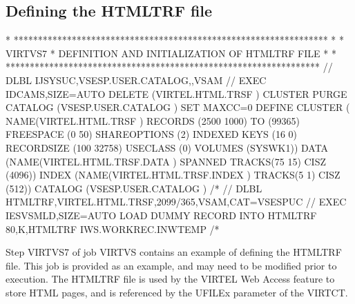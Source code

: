 \documentclass[letterpaper,10pt,english]{sphinxmanual}
\begin{document}
\subsection{Defining the HTMLTRF file}
\label{\detokenize{Installation_Guide:defining-the-htmltrf-file}}
\begin{sphinxVerbatim}[commandchars=\\\{\}]
* *****************************************************************
* * VIRTVS7 * DEFINITION AND INITIALIZATION OF HTMLTRF FILE *
* *****************************************************************
// DLBL IJSYSUC,\PYGZsq{}VSESP.USER.CATALOG\PYGZsq{},,VSAM
// EXEC IDCAMS,SIZE=AUTO
  DELETE (VIRTEL.HTML.TRSF ) \PYGZhy{}
    CLUSTER \PYGZhy{}
    PURGE \PYGZhy{}
    CATALOG (VSESP.USER.CATALOG )
  SET MAXCC=0
  DEFINE CLUSTER ( \PYGZhy{}
    NAME(VIRTEL.HTML.TRSF ) \PYGZhy{}
    RECORDS (2500 1000) \PYGZhy{}
    TO (99365) \PYGZhy{}
    FREESPACE (0 50) \PYGZhy{}
    SHAREOPTIONS (2) \PYGZhy{}
    INDEXED \PYGZhy{}
    KEYS (16 0) \PYGZhy{}
    RECORDSIZE (100 32758) \PYGZhy{}
    USECLASS (0) \PYGZhy{}
    VOLUMES (SYSWK1)) \PYGZhy{}
  DATA (NAME(VIRTEL.HTML.TRSF.DATA ) \PYGZhy{}
    SPANNED \PYGZhy{}
    TRACKS(75 15) \textendash{}
    CISZ (4096)) \PYGZhy{}
  INDEX (NAME(VIRTEL.HTML.TRSF.INDEX ) \PYGZhy{}
    TRACKS(5 1) \textendash{}
    CISZ (512)) \PYGZhy{}
    CATALOG (VSESP.USER.CATALOG )
/*
// DLBL HTMLTRF,\PYGZsq{}VIRTEL.HTML.TRSF\PYGZsq{},2099/365,VSAM,CAT=VSESPUC
// EXEC IESVSMLD,SIZE=AUTO LOAD DUMMY RECORD INTO HTMLTRF
80,K,HTMLTRF
\PYGZdl{}\PYGZdl{}\PYGZdl{}\PYGZdl{}IWS.WORKREC.INW\PYGZdl{}TEMP
/*
\end{sphinxVerbatim}


Step VIRTVS7 of job VIRTVS contains an example of defining the HTMLTRF file. This job is provided as an example, and may need to be modified prior to execution. The HTMLTRF file is used by the VIRTEL Web Access feature to store HTML pages, and is referenced by the UFILEx parameter of the VIRTCT.
\end{document}
